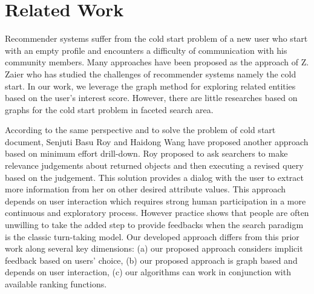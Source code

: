 
\chapter{Related Work}


Recommender systems suffer from the cold start problem of a new user who start with an empty profile and encounters a difficulty of communication with his community members. Many approaches have been proposed \cite{Leung2007, Gao2002} as the approach of Z. Zaier\cite{Zaier2010} who has studied the challenges of recommender systems namely the cold start. In our work, we leverage the graph method for exploring related entities based on the user's interest score. However, there are little researches based on graphs for the cold start problem in faceted search area. 

According to the same perspective and to solve the problem of cold start document, Senjuti Basu Roy and Haidong Wang \cite{Roy2008} have proposed another approach based on minimum effort drill-down. Roy proposed to ask searchers to make relevance judgements about returned objects and then executing a revised query based on the judgement. This solution provides a dialog with the user to extract more information from her on other desired attribute values. This approach depends on user interaction which requires strong human participation in a more continuous and exploratory process. However practice shows that people are often unwilling to take the added step to provide feedbacks when the search paradigm is the classic turn-taking model. Our developed approach differs from this prior work along several key dimensions: (a) our proposed approach considers implicit feedback based on users' choice, (b) our proposed approach is graph based and depends on user interaction, (c) our algorithms can work in conjunction with available ranking functions.

